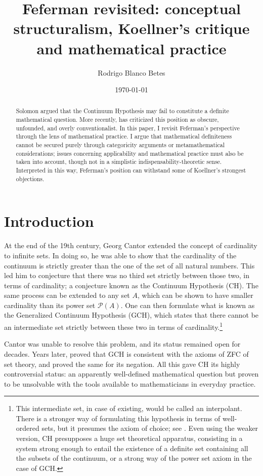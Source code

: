 \documentclass[11pt,a4paper]{article}
\title{\textbf{Feferman revisited: conceptual structuralism, Koellner's critique and mathematical practice}}
\author{Rodrigo Blanco Betes}
\date{\today}
\theoremstyle{plain}
\begin{document}
\maketitle

\begin{abstract}
Solomon \textcite{Feferman2011a} argued that the Continuum Hypothesis may fail to constitute a definite mathematical question. More recently, \textcite{Koellner2016,Koellner2022} has criticized this position as obscure, unfounded, and overly conventionalist. In this paper, I revisit Feferman's perspective through the lens of mathematical practice. I argue that mathematical definiteness cannot be secured purely through categoricity arguments or metamathematical considerations; issues concerning applicability and mathematical practice must also be taken into account, though not in a simplistic indispensability-theoretic sense. Interpreted in this way, Feferman's position can withstand some of Koellner's strongest objections.
\end{abstract}

\section{Introduction}

At the end of the 19th century, Georg Cantor extended the concept of cardinality to infinite sets. In doing so, he was able to show that the cardinality of the continuum is strictly greater than the one of the set of all natural numbers. This led him to conjecture that there was no third set strictly between those two, in terms of cardinality; a conjecture known as the Continuum Hypothesis (CH). The same process can be extended to any set $A$, which can be shown to have smaller cardinality than its power set $\mathcal{P}(A)$. One can then formulate what is known as the Generalized Continuum Hypothesis (GCH), which states that there cannot be an intermediate set strictly between these two in terms of cardinality.\footnote{This intermediate set, in case of existing, would be called an interpolant. There is a stronger way of formulating this hypothesis in terms of well-ordered sets, but it presumes the axiom of choice; see \textcite{Koellner2023}. Even using the weaker version, CH presupposes a huge set theoretical apparatus, consisting in a system strong enough to entail the existence of a definite set containing all the subsets of the continuum, or a strong way of the power set axiom in the case of GCH.}

Cantor was unable to resolve this problem, and its status remained open for decades. Years later, \textcite{Godel1940} proved that GCH is consistent with the axioms of ZFC of set theory, and \textcite{Cohen1966} proved the same for its negation. All this gave CH its highly controversial status: an apparently well-defined mathematical question but proven to be unsolvable with the tools available to mathematicians in everyday practice.
\end{document}
